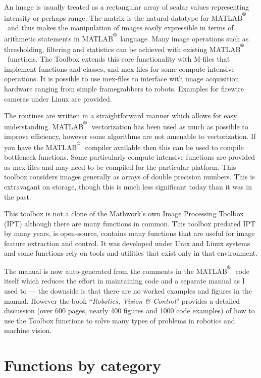 \documentclass[a4paper]{report}
\def\Mlab{MATLAB$^{\textsuperscript{\textregistered}}$}
\begin{document}
An image is usually treated as a rectangular array of scalar values representing
intensity or perhaps range.
The matrix is the natural datatype for \Mlab\ and thus makes the manipulation
of images easily expressible in terms of arithmetic statements in \Mlab
language.
Many image operations such as thresholding, filtering and statistics can
be achieved with existing \Mlab\ functions.
The Toolbox extends this core functionality with M-files that
implement functions and classes, and mex-files for some compute
intensive operations.
It is possible to use mex-files to interface with image acquisition
hardware ranging from simple framegrabbers to robots.
Examples for firewire cameras under Linux are provided.

The routines are written in a straightforward manner which allows
for easy understanding.  \Mlab\ vectorization has been used as much as
possible to improve efficiency, however some algorithms are not amenable
to vectorization.
If you have the \Mlab\ compiler available then this can be used to compile
bottleneck functions.
Some particularly compute intensive functions are provided as mex-files and
may need to be compiled for the particular platform.
This toolbox considers images generally as arrays of double precision
numbers.  This is extravagant on storage, though this is much less
significant today than it was in the past.

This toolbox is not a clone of the Mathwork's own Image Processing 
Toolbox (IPT) although there are many functions in common.
This toolbox predated IPT by many years, is open-source, contains many 
functions that are useful for image feature extraction and control.
It was developed under Unix and Linux systems and some functions
rely on tools and utilities that exist only in that environment.

The manual is now auto-generated from the comments in the \Mlab\ code itself which reduces the effort
in maintaining code and a separate manual as I used to --- the downside is that there are no worked examples and figures in the manual.
However the book ``\textit{Robotics, Vision \& Control}''  provides a detailed discussion (over 600 pages, nearly 400 figures and 1000 code examples)
of how to use the Toolbox functions to
solve many types of problems in robotics and machine vision.


\newpage
\tableofcontents
\newpage
\chapter*{Functions by category}
\begin{multicols}{2}

\end{multicols}
\newpage
\end{document}
